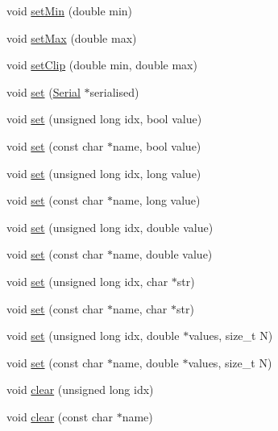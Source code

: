\begin{DoxyCompactItemize}
\item 
void \hyperlink{class_frame_lib___parameters_ad3ade0db8b31a6cc85f4b66b6ad94cca}{set\+Min} (double min)
\item 
void \hyperlink{class_frame_lib___parameters_a921441264480d6e01d6053c21d98a8f8}{set\+Max} (double max)
\item 
void \hyperlink{class_frame_lib___parameters_aadd3ae63aa5ea79bc65f16bc892522e3}{set\+Clip} (double min, double max)
\item 
void \hyperlink{class_frame_lib___parameters_a1028e3913b7f38000f71ce4b172143a7}{set} (\hyperlink{class_frame_lib___parameters_1_1_serial}{Serial} $\ast$serialised)
\item 
void \hyperlink{class_frame_lib___parameters_ac6f06219212d719bdbebfd71ef8af498}{set} (unsigned long idx, bool value)
\item 
void \hyperlink{class_frame_lib___parameters_a9dad319808446724cecb563e73468f44}{set} (const char $\ast$name, bool value)
\item 
void \hyperlink{class_frame_lib___parameters_a84c1cba168d37877b3883302af6c3d9e}{set} (unsigned long idx, long value)
\item 
void \hyperlink{class_frame_lib___parameters_abf85c9c040394d99956bd46b0227b3c7}{set} (const char $\ast$name, long value)
\item 
void \hyperlink{class_frame_lib___parameters_a0391ec487908f254507df22ad88e8745}{set} (unsigned long idx, double value)
\item 
void \hyperlink{class_frame_lib___parameters_a6b1af7f2835bd529388055fac19ba494}{set} (const char $\ast$name, double value)
\item 
void \hyperlink{class_frame_lib___parameters_a076802f4d9ac90035a4202c5acb7333f}{set} (unsigned long idx, char $\ast$str)
\item 
void \hyperlink{class_frame_lib___parameters_aaa0b5e9c31955ba649e69ba8971dbe5d}{set} (const char $\ast$name, char $\ast$str)
\item 
void \hyperlink{class_frame_lib___parameters_a2cd3483982c6b856744bdd8782b2f522}{set} (unsigned long idx, double $\ast$values, size\+\_\+t N)
\item 
void \hyperlink{class_frame_lib___parameters_add616cf6328c08d81d1af54ff6109059}{set} (const char $\ast$name, double $\ast$values, size\+\_\+t N)
\item 
void \hyperlink{class_frame_lib___parameters_a5c0764e11e7723b034fc9951b4dcfb3e}{clear} (unsigned long idx)
\item 
void \hyperlink{class_frame_lib___parameters_a6a4c25214fbf10b639346170c957d3f5}{clear} (const char $\ast$name)

\end{DoxyCompactItemize}
